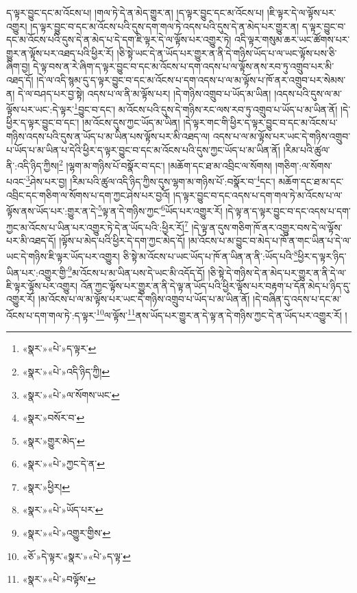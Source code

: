 ད་ལྟར་བྱུང་དང་མ་འོངས་པ། །གལ་ཏེ་དེ་ན་མེད་གྱུར་ན། །ད་ལྟར་བྱུང་དང་མ་འོངས་པ། །ཇི་ལྟར་དེ་ལ་ལྟོས་པར་འགྱུར། །ད་ལྟར་བྱུང་བ་དང་མ་འོངས་པའི་དུས་དག་གལ་ཏེ་འདས་པའི་དུས་དེ་ན་མེད་པར་གྱུར་ན། ད་ལྟར་བྱུང་བ་དང་མ་འོངས་པའི་དུས་དེ་ན་མེད་པ་དེ་དག་ཇི་ལྟར་དེ་ལ་ལྟོས་པར་འགྱུར་ཏེ། འདི་ལྟར་གསུམ་ཆར་ཡང་ཚོགས་པར་གྱུར་ན་ལྟོས་པར་འཐད་པའི་ཕྱིར་རོ། །ཅི་སྟེ་ཡང་དེ་ན་ཡོད་པར་གྱུར་ན་ནི་དེ་གཉིས་ཡོད་པ་ལ་ཡང་ལྟོས་པས་ཅི་ཞིག་བྱ། དེ་ལྟ་བས་ན་རེ་ཞིག་ད་ལྟར་བྱུང་བ་དང་མ་འོངས་པ་དག་འདས་པ་ལ་ལྟོས་ནས་རབ་ཏུ་འགྲུབ་པར་མི་འཐད་དོ། །དེ་ལ་འདི་སྙམ་དུ་ད་ལྟར་བྱུང་བ་དང་མ་འོངས་པ་དག་འདས་པ་ལ་མ་ལྟོས་པ་ཁོ་ནར་འགྲུབ་པར་སེམས་ན། དེ་ལ་བཤད་པར་བྱ་སྟེ། འདས་པ་ལ་ནི་མ་ལྟོས་པར། །དེ་གཉིས་འགྲུབ་པ་ཡོད་མ་ཡིན། །འདས་པའི་དུས་ལ་མ་ལྟོས་པར་ཡང་:དེ་ལྟར་\footnote{«སྣར་»«པེ་»ད་ལྟར་}བྱུང་བ་དང་། མ་འོངས་པའི་དུས་དེ་གཉིས་རང་ལས་རབ་ཏུ་འགྲུབ་པ་ཡོད་པ་མ་ཡིན་ནོ། །དེ་ཕྱིར་ད་ལྟར་བྱུང་བ་དང་། །མ་འོངས་དུས་ཀྱང་ཡོད་མ་ཡིན། །དེ་ལྟར་གང་གི་ཕྱིར་ད་ལྟར་བྱུང་བ་དང་མ་འོངས་པ་གཉིས་འདས་པའི་དུས་ན་ཡོད་པ་མ་ཡིན་པས་ལྟོས་པར་མི་འཐད་ལ། འདས་པ་ལ་མ་ལྟོས་པར་ཡང་དེ་གཉིས་འགྲུབ་པ་ཡོད་པ་མ་ཡིན་པ་དེའི་ཕྱིར་ད་ལྟར་བྱུང་བ་དང་མ་འོངས་པའི་དུས་ཀྱང་ཡོད་པ་མ་ཡིན་ནོ། །རིམ་པའི་ཚུལ་ནི་:འདི་ཉིད་ཀྱིས།\footnote{«སྣར་»«པེ་»འདི་ཉིད་ཀྱི།} །ལྷག་མ་གཉིས་པོ་བསྣོར་བ་དང་། །མཆོག་དང་ཐ་མ་འབྲིང་ལ་སོགས། །གཅིག་:ལ་སོགས་པའང་\footnote{«སྣར་»«པེ་»ལ་སོགས་ཡང་}ཤེས་པར་བྱ། །རིམ་པའི་ཚུལ་འདི་ཉིད་ཀྱིས་དུས་ལྷག་མ་གཉིས་པོ་:བསྣོར་བ་\footnote{«སྣར་»བསོར་བ་}དང་། མཆོག་དང་ཐ་མ་དང་འབྲིང་དང་གཅིག་ལ་སོགས་པ་དག་ཀྱང་ཤེས་པར་བྱའོ། །ད་ལྟར་བྱུང་བ་དང་འདས་པ་དག་གལ་ཏེ་མ་འོངས་པ་ལ་ལྟོས་ནས་ཡོད་པར་:གྱུར་ན་དེ་\footnote{«སྣར་»གྱུར་མེད་}ལྟ་ན་དེ་གཉིས་ཀྱང་\footnote{«སྣར་»«པེ་»ཀྱང་དེ་ན་}ཡོད་པར་འགྱུར་རོ། །དེ་ལྟ་ན་ད་ལྟར་བྱུང་བ་དང་འདས་པ་དག་ཀྱང་མ་འོངས་པ་ཡིན་པར་འགྱུར་ཏེ་དེ་ན་ཡོད་པའི་:ཕྱིར་རོ།\footnote{«སྣར་»ཕྱིར།} །དེ་ལྟ་ན་དུས་གཅིག་ཁོ་ནར་འགྱུར་བས་དེ་ལ་ལྟོས་པར་མི་འཐད་དོ། །ལྟོས་པ་མེད་པའི་ཕྱིར་དེ་དག་ཀྱང་མེད་དོ། །མ་འོངས་པ་མ་བྱུང་བ་མེད་པ་ཁོ་ན་གང་ཡིན་པ་དེ་ལ་ཡང་དེ་གཉིས་ཇི་ལྟར་ཡོད་པར་འགྱུར། ཅི་སྟེ་མ་འོངས་པ་ཡང་ཡོད་པ་ཁོ་ན་ཡིན་ན་ནི་:ཡོད་པའི་\footnote{«སྣར་»«པེ་»ཡོད་པར་}ཕྱིར་ད་ལྟར་ཉིད་ཡིན་པར་:འགྱུར་གྱི་\footnote{«སྣར་»«པེ་»འགྱུར་གྱིས་}མ་འོངས་པ་མ་ཡིན་པས་དེ་ཡང་མི་འདོད་དོ། །ཅི་སྟེ་དེ་གཉིས་དེ་ན་མེད་པར་གྱུར་ན་ནི་དེ་ལ་ཇི་ལྟར་ལྟོས་པར་འགྱུར། འོན་ཀྱང་ལྟོས་པར་གྱུར་ན་ནི་དེ་ལྟ་ན་ཡོད་པའི་ཕྱིར་ལྟོས་པར་བརྟག་པ་དོན་མེད་པ་ཉིད་དུ་འགྱུར་རོ། །མ་འོངས་པ་ལ་མ་ལྟོས་པར་ཡང་དེ་གཉིས་འགྲུབ་པ་ཡོད་པ་མ་ཡིན་ནོ། །དེ་བཞིན་དུ་འདས་པ་དང་མ་འོངས་པ་དག་གལ་ཏེ་:ད་ལྟར་\footnote{«ཅོ་»དེ་ལྟར་«སྣར་»«པེ་»ད་ལྟ་}ལ་ལྟོས་\footnote{«སྣར་»«པེ་»བལྟོས་}ནས་ཡོད་པར་གྱུར་ན་དེ་ལྟ་ན་དེ་གཉིས་ཀྱང་དེ་ན་ཡོད་པར་འགྱུར་རོ། །
